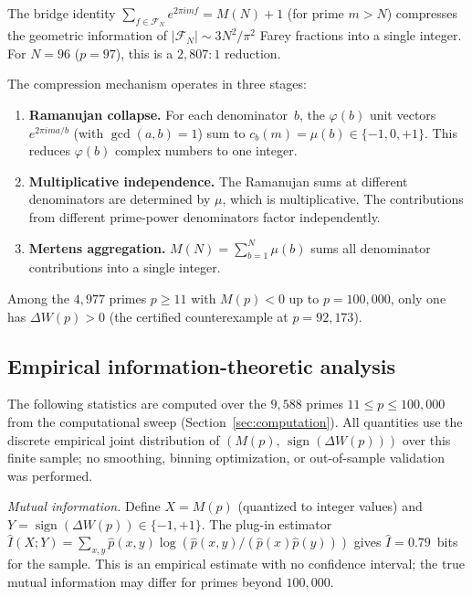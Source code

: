 \documentclass[11pt]{article}
\theoremstyle{definition}
\newcommand{\F}{\mathcal{F}}
\begin{document}
The bridge identity $\sum_{f \in \F_N} e^{2\pi imf} = M(N) + 1$
(for prime $m > N$) compresses the geometric information of
$|\F_N| \sim 3N^2/\pi^2$ Farey fractions into a single integer.
For $N = 96$ ($p = 97$), this is a $2{,}807 : 1$ reduction.

The compression mechanism operates in three stages:
\begin{enumerate}
\item \textbf{Ramanujan collapse.}  For each denominator~$b$,
the $\varphi(b)$ unit vectors $e^{2\pi i m a/b}$ (with
$\gcd(a,b) = 1$) sum to $c_b(m) = \mu(b) \in \{-1, 0, +1\}$.
This reduces $\varphi(b)$ complex numbers to one integer.

\item \textbf{Multiplicative independence.}  The Ramanujan sums
at different denominators are determined by $\mu$, which is
multiplicative.  The contributions from different prime-power
denominators factor independently.

\item \textbf{Mertens aggregation.}
$M(N) = \sum_{b=1}^{N} \mu(b)$ sums all denominator
contributions into a single integer.
\end{enumerate}

\noindent Among the $4{,}977$ primes $p \ge 11$ with $M(p) < 0$
up to $p = 100{,}000$, only one has $\Delta W(p) > 0$ (the
certified counterexample at $p = 92{,}173$).

\subsection{Empirical information-theoretic analysis}

The following statistics are computed over the $9{,}588$ primes
$11 \le p \le 100{,}000$ from the computational sweep
(Section~\ref{sec:computation}).  All quantities use the
discrete empirical joint distribution of $(M(p),\,
\operatorname{sign}(\Delta W(p)))$ over this finite sample;
no smoothing, binning optimization, or out-of-sample validation
was performed.

\emph{Mutual information.}
Define $X = M(p)$ (quantized to integer values) and
$Y = \operatorname{sign}(\Delta W(p)) \in \{-1, +1\}$.
The plug-in estimator
$\hat{I}(X;Y) = \sum_{x,y} \hat{p}(x,y)
\log(\hat{p}(x,y)/(\hat{p}(x)\hat{p}(y)))$
gives $\hat{I} = 0.79$~bits for the sample.
This is an empirical estimate with no confidence interval;
the true mutual information may differ for primes beyond
$100{,}000$.
\end{document}
